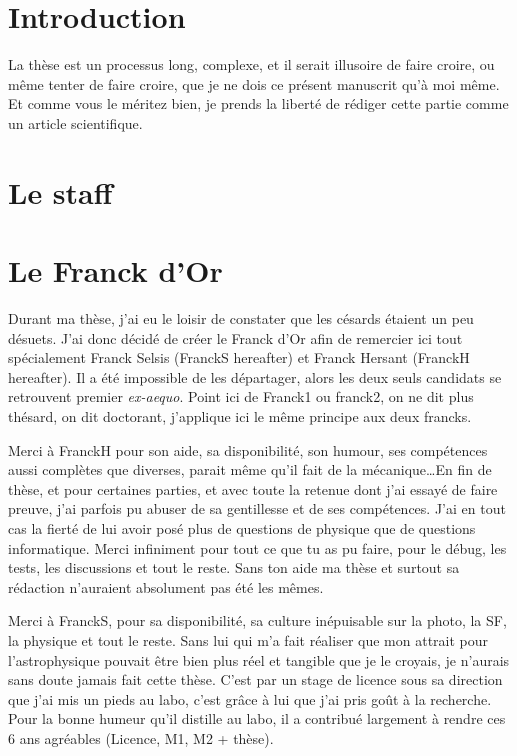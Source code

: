 \section{Introduction}
La thèse est un processus long, complexe, et il serait illusoire de faire croire, ou même tenter de faire croire, que je ne dois ce présent manuscrit qu'à moi même. Et comme vous le méritez bien, je prends la liberté de rédiger cette partie comme un article scientifique. 

\section{Le staff}


\section{Le Franck d'Or}
Durant ma thèse, j'ai eu le loisir de constater que les césards étaient un peu désuets. J'ai donc décidé de créer le Franck d'Or afin de remercier ici tout spécialement Franck Selsis (FranckS hereafter) et Franck Hersant (FranckH hereafter). Il a été impossible de les départager, alors les deux seuls candidats se retrouvent premier \textit{ex-aequo}. Point ici de Franck1 ou franck2, on ne dit plus thésard, on dit doctorant, j'applique ici le même principe aux deux francks. 

Merci à FranckH pour son aide, sa disponibilité, son humour, ses compétences aussi complètes que diverses, parait même qu'il fait de la mécanique\dots En fin de thèse, et pour certaines parties, et avec toute la retenue dont j'ai essayé de faire preuve, j'ai parfois pu abuser de sa gentillesse et de ses compétences. J'ai en tout cas la fierté de lui avoir posé plus de questions de physique que de questions informatique. Merci infiniment pour tout ce que tu as pu faire, pour le débug, les tests, les discussions et tout le reste. Sans ton aide ma thèse et surtout sa rédaction n'auraient absolument pas été les mêmes. 

Merci à FranckS, pour sa disponibilité, sa culture inépuisable sur la photo, la SF, la physique et tout le reste. Sans lui qui m'a fait réaliser que mon attrait pour l'astrophysique pouvait être bien plus réel et tangible que je le croyais, je n'aurais sans doute jamais fait cette thèse. C'est par un stage de licence sous sa direction que j'ai mis un pieds au labo, c'est grâce à lui que j'ai pris goût à la recherche. Pour la bonne humeur qu'il distille au labo, il a contribué largement à rendre ces 6 ans agréables (Licence, M1, M2 + thèse).

